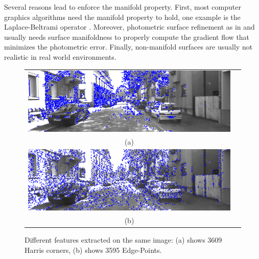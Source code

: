 Several reasons lead to enforce the manifold property. First, most computer graphics algorithms need the manifold property to hold, one example is the Laplace-Beltrami operator \cite{Meyer03}.
Moreover, photometric surface refinement as in \cite{vu_et_al_2012} and \cite{delaunoy_et_al_08} usually needs surface manifoldness to properly compute the gradient flow that minimizes the photometric error. Finally, non-manifold surfaces are usually not realistic in real world environments.


\begin{figure}
\centering
\begin{tabular}{cc}
\includegraphics[width=0.75\columnwidth]{./img//harris}\\
(a)\\
\includegraphics[width=0.75\columnwidth]{./img//edgepoints}\\
(b)\\
\end{tabular}
\caption{Different features extracted on the same image: (a) shows 3609 Harris corners, (b) shows 3595 Edge-Points.}
\label{fig:Edge-Points}
\end{figure}


